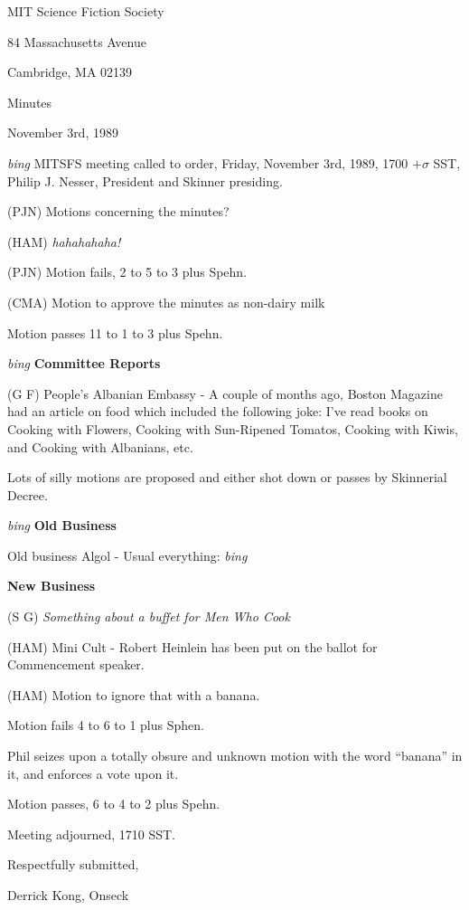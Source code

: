 \setlength{\topmargin}{-0.5in}
\setlength{\oddsidemargin}{-0.60in}
\setlength{\textheight}{9in}
\setlength{\textwidth}{6.5in}



\begin{center}
MIT Science Fiction Society

84 Massachusetts Avenue

Cambridge, MA 02139

\vspace{0.2in}
Minutes

November 3rd, 1989

\end{center}
 
\vspace{0.15in}
{\em bing\/}  MITSFS meeting called to order, Friday, November 3rd, 1989,
1700 $+ \sigma$ SST, Philip J. Nesser, President and Skinner
presiding.

(PJN) Motions concerning the minutes?

(HAM) {\em hahahahaha!}

(PJN) Motion fails, 2 to 5 to 3 plus Spehn.

(CMA) Motion to approve the minutes as non-dairy milk \underline{        }

Motion passes 11 to 1 to 3 plus Spehn.

\vspace{0.15in}
{\em bing\/} {\bf Committee Reports}

(G F) People's Albanian Embassy - A couple of months ago, Boston
Magazine had an article on food which included the following joke:
I've read books on Cooking with Flowers, Cooking with Sun-Ripened
Tomatos, Cooking with Kiwis, and Cooking with Albanians, etc.

Lots of silly motions are proposed and either shot down or passes by
Skinnerial Decree.

\vspace{0.15in}
{\em bing\/}  {\bf Old Business}

Old business Algol - Usual everything: {\em bing\/}

\vspace{0.15in}
{\bf New Business}

(S G) {\em Something about a buffet for Men Who Cook}

(HAM) Mini Cult - Robert Heinlein has been put on the ballot for
Commencement speaker.

(HAM) Motion to ignore that with a banana.

Motion fails 4 to 6 to 1 plus Sphen.

Phil seizes upon a totally obsure and unknown motion with the word
``banana'' in it, and enforces a vote upon it.

Motion passes, 6 to 4 to 2 plus Spehn.

Meeting adjourned, 1710 SST.

\vspace{0.15in}
\begin{center}
Respectfully submitted,

Derrick Kong, Onseck
\end{center}

